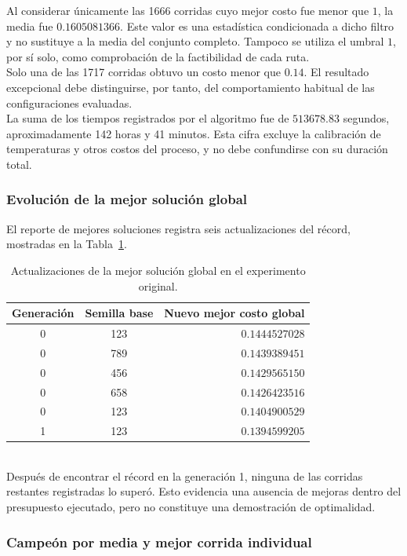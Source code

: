 \documentclass[12pt]{article}
\begin{document}
Al considerar únicamente las 1666 corridas cuyo mejor costo fue
menor que $1$, la media fue $0.1605081366$. Este valor es una
estadística condicionada a dicho filtro y no sustituye a la media
del conjunto completo. Tampoco se utiliza el umbral $1$, por sí solo,
como comprobación de la factibilidad de cada ruta.
\\
Solo una de las 1717 corridas obtuvo un costo menor que $0.14$.
El resultado excepcional debe distinguirse, por tanto, del
comportamiento habitual de las configuraciones evaluadas.
\\
La suma de los tiempos registrados por el algoritmo fue de
$513678.83$ segundos, aproximadamente 142 horas y 41 minutos.
Esta cifra excluye la calibración de temperaturas y otros costos
del proceso, y no debe confundirse con su duración total.

\subsubsection{Evolución de la mejor solución global}

El reporte de mejores soluciones registra seis actualizaciones
del récord, mostradas en la Tabla~\ref{tab:resultados150-records}.
\begin{table}[htbp]
    \centering
    \small
    \begin{tabular}{ccr}
        \hline
        Generación & Semilla base & Nuevo mejor costo global \\
        \hline
        0 & 123 & $0.1444527028$ \\
        0 & 789 & $0.1439389451$ \\
        0 & 456 & $0.1429565150$ \\
        0 & 658 & $0.1426423516$ \\
        0 & 123 & $0.1404900529$ \\
        1 & 123 & $\mathbf{0.1394599205}$ \\
        \hline
    \end{tabular}
    \caption{Actualizaciones de la mejor solución global
    en el experimento original.}
    \label{tab:resultados150-records}
\end{table}
\\
Después de encontrar el récord en la generación 1, ninguna de las
corridas restantes registradas lo superó. Esto evidencia una
ausencia de mejoras dentro del presupuesto ejecutado, pero no
constituye una demostración de optimalidad.

\subsubsection{Campeón por media y mejor corrida individual}
\end{document}
